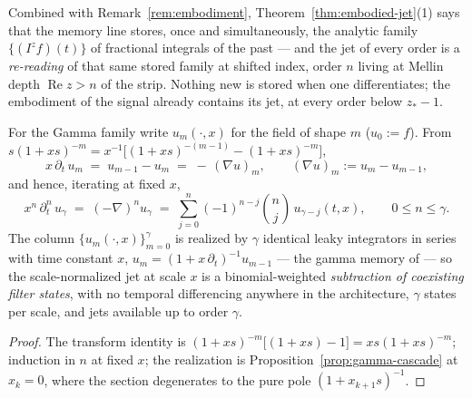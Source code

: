 \begin{remark}\label{rem:reindexing}
Combined with Remark~\ref{rem:embodiment}, Theorem~\ref{thm:embodied-jet}(1) says that the
memory line stores, once and simultaneously, the analytic family $\{(I^{z} f)(t)\}$ of
fractional integrals of the past --- and the jet of every order is a \emph{re-reading} of that
same stored family at shifted index, order $n$ living at Mellin depth
$\operatorname{Re} z > n$ of the strip. Nothing new is stored when one differentiates; the
embodiment of the signal already contains its jet, at every order below $z_* - 1$.
\end{remark}



\begin{proposition}\label{prop:gamma-jets}
For the Gamma family write $u_m(\cdot, x)$ for the field of shape $m$ ($u_0 := f$). From
$s(1 + xs)^{-m} = x^{-1}\bigl[(1 + xs)^{-(m-1)} - (1 + xs)^{-m}\bigr]$,
\[
  x\,\partial_t\, u_m \;=\; u_{m-1} - u_m \;=\; -\,(\nabla u)_m,
  \qquad (\nabla u)_m := u_m - u_{m-1},
\]
and hence, iterating at fixed $x$,
\[
  x^n\,\partial_t^n\, u_\gamma \;=\; (-\nabla)^n u_\gamma
  \;=\; \sum_{j=0}^{n} (-1)^{n-j}\binom{n}{j}\, u_{\gamma - j}(t, x),
  \qquad 0 \le n \le \gamma .
\]
The column $\{u_m(\cdot, x)\}_{m=0}^{\gamma}$ is realized by $\gamma$ identical leaky
integrators in series with time constant $x$, $u_m = (1 + x\,\partial_t)^{-1} u_{m-1}$ --- the
gamma memory of  --- so the scale-normalized jet at scale $x$ is a
binomial-weighted \emph{subtraction of coexisting filter states}, with no temporal
differencing anywhere in the architecture, $\gamma$ states per scale, and jets available up
to order $\gamma$.
\end{proposition}

\begin{proof}
The transform identity is $(1+xs)^{-m}\bigl[(1+xs) - 1\bigr] = xs(1+xs)^{-m}$; induction in
$n$ at fixed $x$; the realization is Proposition~\ref{prop:gamma-cascade} at $x_k = 0$,
where the section degenerates to the pure pole $(1 + x_{k+1}s)^{-1}$.
\end{proof}

